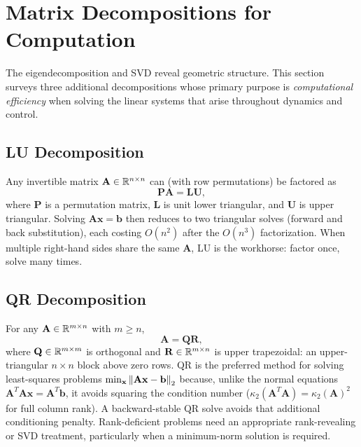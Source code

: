 
\section{Matrix Decompositions for Computation}
\label{sec:matrix_decompositions_computation}

The eigendecomposition and SVD reveal geometric structure.  This section
surveys three additional decompositions whose primary purpose is
\emph{computational efficiency} when solving the linear systems that
arise throughout dynamics and control.

\subsection{LU Decomposition}
\label{subsec:lu_decomposition}

Any invertible matrix $\mathbf{A}\in\mathbb{R}^{n\times n}$ can (with row
permutations) be factored as
\begin{equation}
  \label{eq:lu_decomposition}
  \mathbf{P}\mathbf{A} = \mathbf{L}\mathbf{U},
\end{equation}
where $\mathbf{P}$ is a permutation matrix, $\mathbf{L}$ is unit lower
triangular, and $\mathbf{U}$ is upper triangular.  Solving
$\mathbf{A}\mathbf{x}=\mathbf{b}$ then reduces to two triangular
solves (forward and back substitution), each costing $O(n^{2})$ after
the $O(n^{3})$ factorization.  When multiple right-hand sides share
the same $\mathbf{A}$, LU is the workhorse: factor once, solve many
times.

\subsection{QR Decomposition}
\label{subsec:qr_decomposition}

For any $\mathbf{A}\in\mathbb{R}^{m\times n}$ with $m\geq n$,
\begin{equation}
  \label{eq:qr_decomposition}
  \mathbf{A} = \mathbf{Q}\mathbf{R},
\end{equation}
where $\mathbf{Q}\in\mathbb{R}^{m\times m}$ is orthogonal and
$\mathbf{R}\in\mathbb{R}^{m\times n}$ is upper trapezoidal: an upper-triangular $n\times n$ block above zero rows.
QR is the preferred method for solving least-squares problems
$\min_{\mathbf{x}}\left\lVert \mathbf{A}\mathbf{x}-\mathbf{b} \right\rVert_2$ because,
unlike the normal equations $\mathbf{A}^{T}\mathbf{A}\mathbf{x}=
\mathbf{A}^{T}\mathbf{b}$, it avoids squaring the condition number
($\kappa_2(\mathbf{A}^{T}\mathbf{A})=\kappa_2(\mathbf{A})^{2}$ for full column rank). A backward-stable QR solve avoids that additional conditioning penalty. Rank-deficient problems need an appropriate rank-revealing or SVD treatment, particularly when a minimum-norm solution is required.

